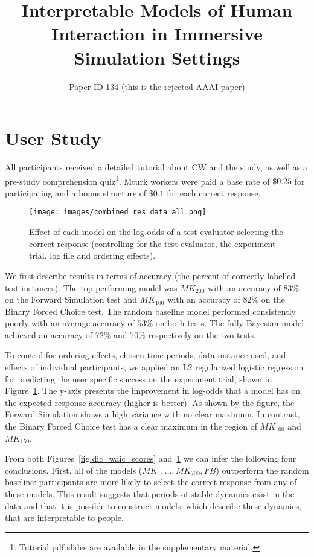 \documentclass[letterpaper]{article} %
\title{Interpretable Models of Human Interaction in Immersive Simulation Settings}
\author{Paper ID 134 (this is the rejected AAAI paper)}
\begin{document}
\section{User Study}
\label{sec:interpretability_results}













All participants received a detailed tutorial about CW and the study, as well as a pre-study comprehension quiz\footnote{Tutorial pdf slides are available in the supplementary material.}. Mturk workers were paid a base rate of $\$0.25$ for participating and a bonus structure of $\$0.1$ for each correct response.






\begin{figure}[t]


\texttt{[image: images/combined\_res\_data\_all.png]}
\caption{Effect of each model on the log-odds of a test evaluator selecting the correct response (controlling for the test evaluator, the experiment trial, log file and ordering effects).}
\label{fig:essil_test_results}
\end{figure}


We first describe results in terms of accuracy (the percent of correctly labelled test instances).
The top performing model was $MK_{200}$ with an accuracy of $83\%$ on the Forward Simulation  test and $MK_{100}$  with an accuracy of $82\%$ on the Binary Forced Choice test.
The random baseline model performed consistently poorly with an average accuracy of $53\%$ on both tests.
The fully Bayesian model achieved an accuracy of $72\%$ and $70\%$ respectively on the two tests.

To control for ordering effects, chosen time periods, data instance used, and effects of individual participants, we applied an L2 regularized logistic regression for predicting  the user specific success on the experiment trial, shown  in  Figure~\ref{fig:essil_test_results}. The y-axis presents the improvement in log-odds that a model has on the expected response accuracy (higher is better).
As shown by the figure,  the Forward Simulation shows a high variance with no clear maximum. In contrast, the Binary Forced Choice test has a clear maximum in the region of $MK_{100}$ and $MK_{150}$.

From both Figures~\ref{fig:dic_waic_scores} and~\ref{fig:essil_test_results} we can infer the following four conclusions.
First, all of the models ($MK_{1},\ldots,MK_{700}, FB$) outperform the random baseline: participants are more likely to select the correct response from any of these models. This result suggests that periods of stable dynamics  exist in the data and that it is possible to construct models, which describe these dynamics, that are interpretable to people.
\end{document}
